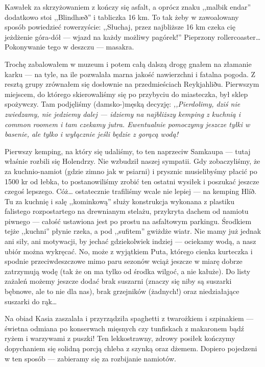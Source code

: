 Kawałek za skrzyżowaniem  z  kończy się asfalt, a oprócz znaku ,,malbik endar'' dodatkowo stoi ,,Blindhæð'' i tabliczka 16 km. To tak żeby w zawoalowany sposób powiedzieć rowerzyście: ,,Słuchaj, przez najbliższe 16 km czeka cię jeżdżenie góra-dół --- wjazd na każdy możliwy pagórek!'' Pieprzony rollercoaster… Pokonywanie tego w deszczu --- masakra.


Trochę zabalowałem w muzeum i potem całą dalszą drogę gnałem na złamanie karku --- na tyle, na ile pozwalała marna jakość nawierzchni i fatalna pogoda. Z resztą grupy zrównałem się dosłownie na przedmieściach Reykjahliðu. Pierwszym miejscem, do którego skierowaliśmy się po przybyciu do miasteczka, był sklep spożywczy. Tam podjęliśmy (damsko-)męską decyzję: \emph{,,Pierdolimy, dziś nie zwiedzamy, nie jedziemy dalej --- idziemy na najbliższy kemping z kuchnią i common roomem i tam czekamy jutra. Ewentualnie pomoczymy jeszcze tyłki w basenie, ale tylko i wyłącznie jeśli będzie z gorącą wodą!}

Pierwszy kemping, na który się udaliśmy, to ten naprzeciw Samkaupa --- tutaj właśnie rozbili się Holendrzy. Nie wzbudził naszej sympatii. Gdy zobaczyliśmy, że za kuchnio-namiot (gdzie zimno jak w psiarni) i prysznic musielibyśmy płacić po 1500 kr od łebka, to postanowiliśmy zrobić ten ostatni wysiłek i poszukać jeszcze czegoś lepszego. Cóż… ostatecznie trafiliśmy wcale nie lepiej --- na kemping Hlíð. Tu za kuchnię i salę ,,kominkową'' służy konstrukcja wykonana z plastiku falistego rozpostartego na drewnianym stelażu, przykryta dachem od namiotu piwnego --- całość ustawiona jest po prostu na asfaltowym parkingu. Środkiem tejże ,,kuchni'' płynie rzeka, a pod ,,sufitem'' gwiżdże wiatr. Nie mamy już jednak ani siły, ani motywacji, by jechać gdziekolwiek indziej --- ociekamy wodą, a nasz ubiór można wykręcać. No, może z wyjątkiem Puta, którego cienka kurteczka i spodnie przeciwdeszczowe mimo paru sezonów wciąż jeszcze w miarę dobrze zatrzymują wodę (tak że on ma tylko od środka wilgoć, a nie kałuże). Do listy zażaleń możemy jeszcze dodać brak suszarni (znaczy się niby są suszarki bębnowe, ale to nie dla nas), brak grzejników (żadnych!) oraz niedziałające suszarki do rąk…

Na obiad Kasia zaszalała i przyrządziła spaghetti z twarożkiem i szpinakiem --- świetna odmiana po konserwach mięsnych czy tunfiskach z makaronem bądź ryżem i warzywami z puszki! Ten lekkostrawny, zdrowy posiłek kończymy dopychaniem się solidną porcją chleba z szynką oraz dżemem. Dopiero pojedzeni w ten sposób --- zabieramy się za rozbijanie namiotów.


